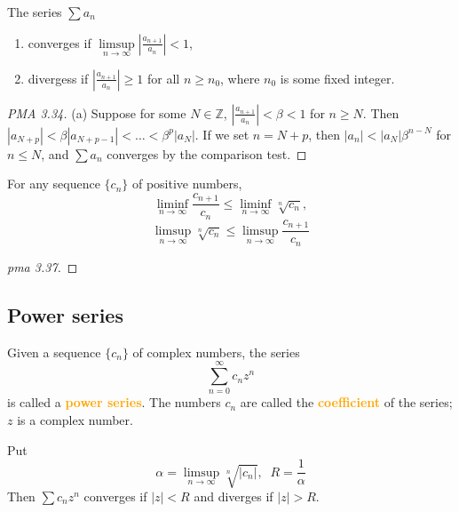 \begin{mytheorem}
\label{thm:ratio_test}
The series $\sum a_n$
\begin{enumerate}[label={(\alph*)}]
\item converges if $\limsup\limits_{n\to \infty}|\frac{a_{n+1}}{a_n}|<1$,
\item divergess if $|\frac{a_{n+1}}{a_n}|\geq 1$ for all $n\geq n_0$, where $n_0$ is some fixed integer.
\end{enumerate}
\end{mytheorem}
\begin{proof}
[PMA 3.34]
(a) Suppose for some $N\in \mathbb{Z}$, $\displaystyle \left|\frac{a_{n+1}}{a_n}\right|<\beta<1$ for $n\geq N$. Then $|a_{N+p}|<\beta|a_{N+p-1}|<\dots<\beta^p|a_N|$. If we set $n=N+p$, then $|a_n|<|a_N|\beta^{n-N}$ for $n\leq N$, and $\sum a_n$ converges by the comparison test.
\end{proof}

\begin{myproposition}
For any sequence $\{c_n\}$ of positive numbers,
$$\liminf_{n\to \infty}\frac{c_{n+1}}{c_n}\leq \liminf_{n\to \infty}\sqrt[n]{c_n},$$
$$\limsup_{n\to \infty}\sqrt[n]{c_n}\leq \limsup_{n\to \infty}\frac{c_{n+1}}{c_n}$$
\end{myproposition}
\begin{proof}
[pma 3.37]
\end{proof}

\subsection{Power series}
\begin{definition}
[pma 3.38]
Given a sequence $\{c_n\}$ of complex numbers, the series
$$\sum_{n=0}^{\infty}c_nz^n$$
is called a \textbf{\textcolor{orange}{power series}}. The numbers $c_n$ are called the \textbf{\textcolor{orange}{coefficient}} of the series; $z$ is a complex number.
\end{definition}

\begin{theorem}
[pma 3.39]
Put $$\alpha =\limsup_{n\to \infty}\sqrt[n]{|c_n|},\;\;R=\frac{1}{\alpha}$$
Then $\sum c_nz^n$ converges if $|z|<R$ and diverges if $|z|>R$.
\end{theorem}


